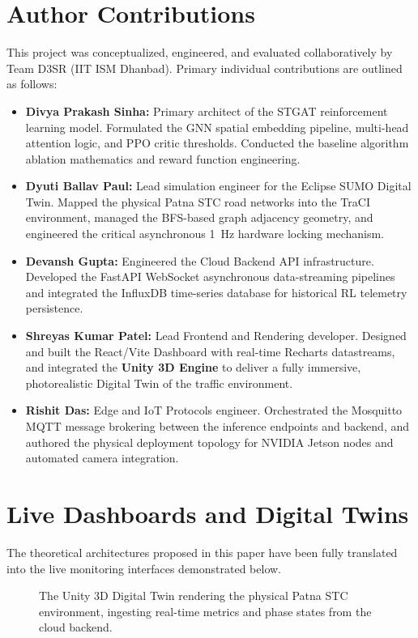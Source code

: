 \documentclass[12pt, onecolumn]{IEEEtran}
\begin{document}
\section*{Author Contributions}
This project was conceptualized, engineered, and evaluated collaboratively by Team D3SR (IIT ISM Dhanbad). Primary individual contributions are outlined as follows:
\begin{itemize}
    \item \textbf{Divya Prakash Sinha:} Primary architect of the STGAT reinforcement learning model. Formulated the GNN spatial embedding pipeline, multi-head attention logic, and PPO critic thresholds. Conducted the baseline algorithm ablation mathematics and reward function engineering.
    \item \textbf{Dyuti Ballav Paul:} Lead simulation engineer for the Eclipse SUMO Digital Twin. Mapped the physical Patna STC road networks into the TraCI environment, managed the BFS-based graph adjacency geometry, and engineered the critical asynchronous 1~Hz hardware locking mechanism.
    \item \textbf{Devansh Gupta:} Engineered the Cloud Backend API infrastructure. Developed the FastAPI WebSocket asynchronous data-streaming pipelines and integrated the InfluxDB time-series database for historical RL telemetry persistence.
    \item \textbf{Shreyas Kumar Patel:} Lead Frontend and Rendering developer. Designed and built the React/Vite Dashboard with real-time Recharts datastreams, and integrated the \textbf{Unity 3D Engine} to deliver a fully immersive, photorealistic Digital Twin of the traffic environment.
    \item \textbf{Rishit Das:} Edge and IoT Protocols engineer. Orchestrated the Mosquitto MQTT message brokering between the inference endpoints and backend, and authored the physical deployment topology for NVIDIA Jetson nodes and automated camera integration.
\end{itemize}

\appendices
\section{Live Dashboards and Digital Twins}
The theoretical architectures proposed in this paper have been fully translated into the live monitoring interfaces demonstrated below.

\begin{figure}[H]
    \centering
    \caption{The Unity 3D Digital Twin rendering the physical Patna STC environment, ingesting real-time metrics and phase states from the cloud backend.}
    \label{fig:app_unity}
\end{figure}
\end{document}
